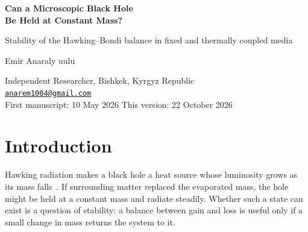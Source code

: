 \documentclass[11pt,a4paper]{article}
\begin{document}
\begin{center}
{\LARGE\bfseries Can a Microscopic Black Hole\\[2pt] Be Held at Constant Mass?\par}
\vspace{5pt}
{\large Stability of the Hawking--Bondi balance in fixed and thermally coupled media\par}
\vspace{13pt}
{\normalsize Emir Anaraly uulu\par}
Independent Researcher, Bishkek, Kyrgyz Republic\\
\href{mailto:anarem1004@gmail.com}{\texttt{anarem1004@gmail.com}}\\[7pt]
First manuscript: 10 May 2026 \quad\textbar\quad This version: 22 October 2026
\end{center}
\vspace{4pt}

\begin{abstract}
A microscopic black hole loses mass by Hawking evaporation and can regain it by accreting the surrounding gas. We ask whether the two processes can hold its mass constant. Combining idealized Bondi accretion with a blackbody approximation to Hawking emission, we first show that in a fixed medium the mass equation has exactly one positive balance and that this balance is unstable; an exact implicit solution gives the evaporation and growth times on either side. We then let the hole's radiation heat the medium. Coupling the mass to an effective gas temperature, with the Bondi rate scaling as $T^{-3/2}$ and linear cooling, yields a single hotter and more massive equilibrium whose Jacobian determinant is negative for every positive heating and cooling strength, so the equilibrium is a saddle. The result extends to any one-zone model in which heating decreases with mass, accretion decreases with temperature and cooling increases with temperature. Its origin is the sign of the feedback: unlike an accretion-powered source, a Hawking-powered hole radiates more as it loses mass, so heating suppresses accretion exactly when accretion is needed. Timescale estimates for two hydrogen plasmas show that neither supports the one-zone description at the balance mass. All results are reproducible from the accompanying code.
\end{abstract}

\section{Introduction}
Hawking radiation makes a black hole a heat source whose luminosity grows as its mass falls~\cite{hawking}. If surrounding matter replaced the evaporated mass, the hole might be held at a constant mass and radiate steadily. Whether such a state can exist is a question of stability: a balance between gain and loss is useful only if a small change in mass returns the system to it.
\end{document}
